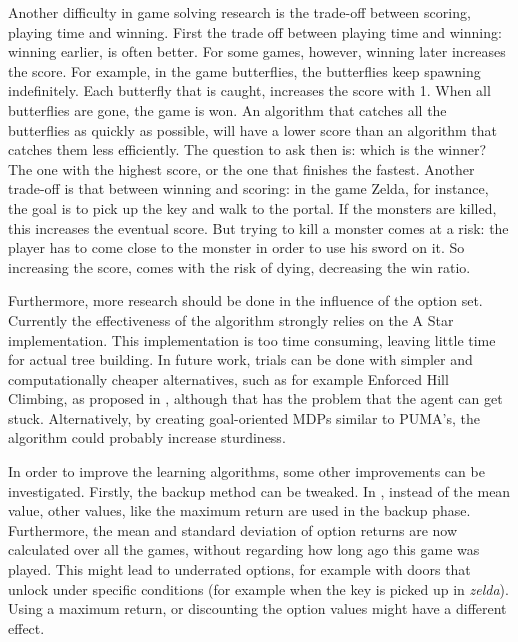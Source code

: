 Another difficulty in game solving research is the trade-off between scoring,
playing time and winning. First the trade off between playing time and winning:
winning earlier, is often better. For some games, however, winning later
increases the score. For example, in the game butterflies, the butterflies keep
spawning indefinitely. Each butterfly that is caught, increases the score with
1. When all butterflies are gone, the game is won. An algorithm that catches all
the butterflies as quickly as possible, will have a lower score than an
algorithm that catches them less efficiently. The question to ask then is: which
is the winner? The one with the highest score, or the one that finishes the
fastest. Another trade-off is that between winning and scoring: in the game
Zelda, for instance, the goal is to pick up the key and walk to the portal. If
the monsters are killed, this increases the eventual score. But trying to kill a
monster comes at a risk: the player has to come close to the monster in order to
use his sword on it. So increasing the score, comes with the risk of dying,
decreasing the win ratio.




Furthermore, more research should be done in the influence of the option set.
Currently the effectiveness of the algorithm strongly relies on the A Star
implementation. This implementation is too time consuming, leaving
little time for actual tree building. In future work, trials can be done with
simpler and computationally cheaper alternatives, such as for example Enforced
Hill Climbing, as proposed in \cite{ross2014general}, although that has the
problem that the agent can get stuck. Alternatively, by creating goal-oriented
MDPs similar to PUMA's, the algorithm could probably increase sturdiness.


In order to improve the learning algorithms, some other improvements can be
investigated. Firstly, the backup method can be tweaked. In
\cite{coulom2007efficient}, instead of the mean value, other values, like the
maximum return are used in the backup phase. Furthermore, the mean and standard
deviation of option returns are now calculated over all the games, without
regarding how long ago this game was played. This might lead to underrated
options, for example with doors that unlock under specific conditions (for
example when the key is picked up in \textit{zelda}).  Using a maximum return,
or discounting the option values might have a different effect.

